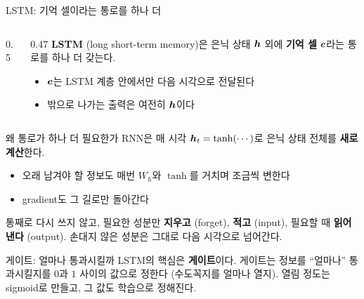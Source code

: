 \documentclass[aspectratio=169,11pt]{beamer}
\begin{document}
\begin{frame}{LSTM: 기억 셀이라는 통로를 하나 더}
\begin{columns}[c,onlytextwidth]
\begin{column}{0.5\textwidth}
\end{column}
\begin{column}{0.47\textwidth}
\textbf{LSTM} (long short-term memory)은 은닉 상태 $\bm{h}$ 외에
\textbf{기억 셀} $\bm{c}$라는 통로를 하나 더 갖는다.
\vskip2mm
\begin{itemize}
\item $\bm{c}$는 LSTM 계층 안에서만 다음 시각으로 전달된다
\item 밖으로 나가는 출력은 여전히 $\bm{h}$이다
\end{itemize}
\end{column}
\end{columns}
\end{frame}

\begin{frame}{왜 통로가 하나 더 필요한가}
RNN은 매 시각 $\bm{h}_t=\tanh(\cdots)$로 은닉 상태 전체를 \textbf{새로 계산}한다.
\begin{itemize}
\item 오래 남겨야 할 정보도 매번 $W_h$와 $\tanh$를 거치며 조금씩 변한다
\item gradient도 그 길로만 돌아간다
\end{itemize}
\vskip2mm
\begin{keybox}
통째로 다시 쓰지 않고, 필요한 성분만
\textbf{지우고} (forget), \textbf{적고} (input), 필요할 때 \textbf{읽어 낸다} (output).
손대지 않은 성분은 그대로 다음 시각으로 넘어간다.
\end{keybox}
\end{frame}

\begin{frame}{게이트: 얼마나 통과시킬까}
LSTM의 핵심은 \textbf{게이트}이다.
게이트는 정보를 ``얼마나'' 통과시킬지를 $0$과 $1$ 사이의 값으로 정한다 (수도꼭지를 얼마나 열지).
\vskip1mm
열림 정도는 sigmoid로 만들고, 그 값도 학습으로 정해진다.
\end{frame}
\end{document}

